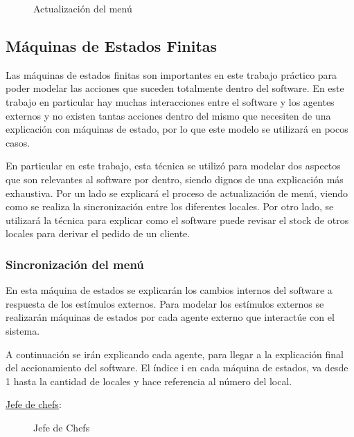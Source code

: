 \documentclass[a4paper,10pt]{article}
\begin{document}
\begin{figure}[H]
\centering
{}
\caption{Actualizaci\'on del men\'u}
\end{figure}


\bigskip

\subsection*{M\'aquinas de Estados Finitas}

Las m\'aquinas de estados finitas son importantes en este trabajo pr\'actico para poder modelar las acciones que suceden totalmente dentro del software. En este trabajo en particular hay muchas interacciones entre el software y los agentes externos y no existen tantas acciones dentro del mismo que necesiten de una explicaci\'on con m\'aquinas de estado, por lo que este modelo se utilizar\'a en pocos casos. 

En particular en este trabajo, esta t\'ecnica se utiliz\'o para modelar dos aspectos que son relevantes al software por dentro, siendo dignos de una explicaci\'on m\'as exhaustiva. Por un lado se explicar\'a el proceso de actualizaci\'on de men\'u, viendo como se realiza la sincronizaci\'on entre los diferentes locales. Por otro lado, se utilizar\'a la t\'ecnica para explicar como el software puede revisar el stock de otros locales para derivar el pedido de un cliente.


\subsubsection*{Sincronizaci\'on del men\'u}

En esta m\'aquina de estados se explicar\'an los cambios internos del software a respuesta de los est\'imulos externos. Para modelar los est\'imulos externos se realizar\'an m\'aquinas de estados por cada agente externo que interactúe con el sistema.

A continuaci\'on se ir\'an explicando cada agente, para llegar a la explicaci\'on final del accionamiento del software.
El \'indice i en cada m\'aquina de estados, va desde 1 hasta la cantidad de locales y hace referencia al n\'umero del local.

\noindent \underline{Jefe de chefs}:

\begin{figure}[H]
\centering
{}
\caption{Jefe de Chefs}
\end{figure}
\end{document}
